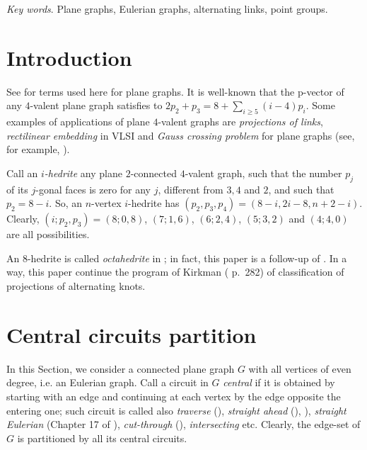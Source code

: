 \documentclass[12pt]{article}
\begin{document}
{\em Key words}. Plane graphs, Eulerian graphs, alternating links, point groups.

\section{Introduction}

See \cite{Gr} for terms used here for plane graphs.
It is well-known that the p-vector of any $4$-valent plane graph satisfies to
$2p_2+p_3=8+ \sum_{i\geq 5} (i-4)p_i$.
Some examples of applications of plane $4$-valent graphs are {\em projections
of links}, {\em rectilinear embedding} in VLSI and {\em Gauss crossing 
problem} for plane graphs (see, for example, \cite{Liu}).

\vspace{2mm}


Call an {\em $i$-hedrite} any plane $2$-connected
$4$-valent graph, such that the number
$p_j$ of its $j$-gonal faces is zero for any $j$, different from 
$3,4$ and $2$, and such that $p_2=8-i$. So, 
an $n$-vertex $i$-hedrite has $(p_2, p_3, p_4)=(8-i, 2i-8, n+2-i)$.
Clearly, $(i;p_2,p_3)=(8;0,8)$, $(7;1,6)$, $(6;2,4)$,
$(5;3,2)$ and $(4;4,0)$ are all possibilities. 

An $8$-hedrite is called {\em octahedrite} in \cite{DSt}; in fact, this paper is a follow-up of \cite{DSt}.
In a way, this paper continue the program of Kirkman (\cite{Kirk} p.~282) of classification of projections of alternating knots.


















\section{Central circuits partition}

In this Section, we consider a connected plane graph $G$ with all vertices of 
even degree, i.e. an Eulerian graph. 
Call a circuit in $G$ {\it central} if it is obtained by starting with an
edge and continuing at each vertex by the edge opposite the entering one; such 
circuit is called also {\em traverse} 
(\cite{GK}), {\em straight ahead} (\cite{Ha}),  \cite{PTZ}), 
{\em straight Eulerian} (Chapter 17 of \cite{God}), 
{\em cut-through} (\cite{Je}),
{\em intersecting} etc. Clearly, the edge-set of 
$G$ is partitioned by all its central circuits.
\end{document}
